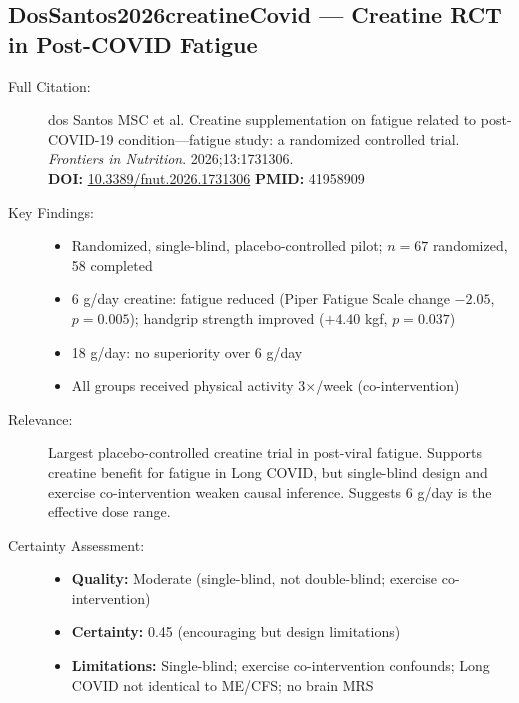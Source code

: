 \subsection*{DosSantos2026creatineCovid --- Creatine RCT in Post-COVID Fatigue}
\begin{description}
    \item[Full Citation:] dos Santos MSC et al. Creatine supplementation on fatigue related to post-COVID-19 condition---fatigue study: a randomized controlled trial. \textit{Frontiers in Nutrition}. 2026;13:1731306.\\
    \textbf{DOI:} \href{https://doi.org/10.3389/fnut.2026.1731306}{10.3389/fnut.2026.1731306} \quad \textbf{PMID:} 41958909
    \item[Key Findings:]
    \begin{itemize}
        \item Randomized, single-blind, placebo-controlled pilot; $n = 67$ randomized, 58 completed
        \item 6 g/day creatine: fatigue reduced (Piper Fatigue Scale change $-2.05$, $p = 0.005$); handgrip strength improved ($+4.40$ kgf, $p = 0.037$)
        \item 18 g/day: no superiority over 6 g/day
        \item All groups received physical activity 3$\times$/week (co-intervention)
    \end{itemize}
    \item[Relevance:] Largest placebo-controlled creatine trial in post-viral fatigue. Supports creatine benefit for fatigue in Long COVID, but single-blind design and exercise co-intervention weaken causal inference. Suggests 6 g/day is the effective dose range.
    \item[Certainty Assessment:]
    \begin{itemize}
        \item \textbf{Quality:} Moderate (single-blind, not double-blind; exercise co-intervention)
        \item \textbf{Certainty:} 0.45 (encouraging but design limitations)
        \item \textbf{Limitations:} Single-blind; exercise co-intervention confounds; Long COVID not identical to ME/CFS; no brain MRS
    \end{itemize}
\end{description}

